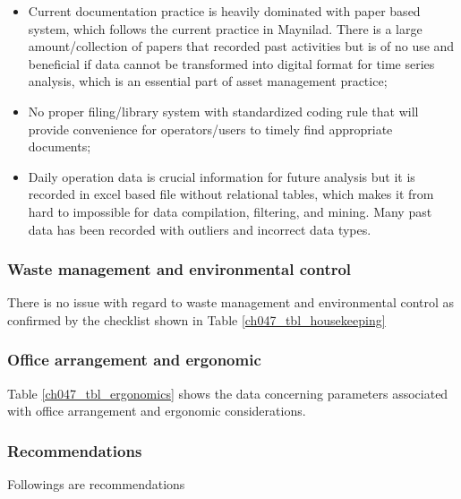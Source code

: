 \begin{itemize}
\item Current documentation practice is heavily dominated with paper based system, which follows the current practice in Maynilad. There is a large amount/collection of papers that recorded past activities but is of no use and beneficial if data cannot be transformed into digital format for time series analysis, which is an essential part of asset management practice;

\item No proper filing/library system with standardized coding rule that will provide convenience for operators/users to timely find appropriate documents;

\item Daily operation data is crucial information for future analysis but it is recorded in excel based file without relational tables, which makes it from hard to impossible for data compilation, filtering, and mining. Many past data has been recorded with outliers and incorrect data types. 

\end{itemize}

\subsubsection{Waste management and environmental control}
There is no issue with regard to waste management and environmental control as confirmed by the checklist shown in Table \ref{ch047_tbl_housekeeping}




\subsubsection{Office arrangement and ergonomic}
Table \ref{ch047_tbl_ergonomics} shows the data concerning parameters associated with office arrangement and ergonomic considerations.




%

\subsubsection{Recommendations}
Followings are recommendations

